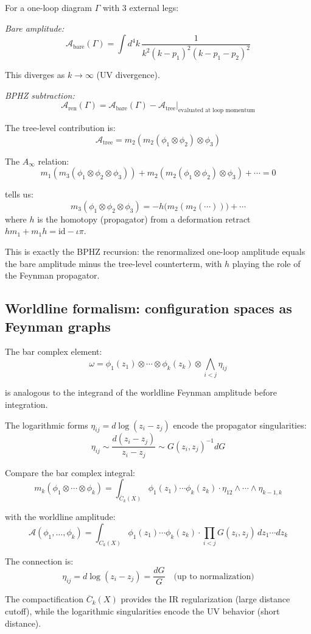 \begin{example}
\label{ex:bphz-one-loop}
For a one-loop diagram $\Gamma$ with 3 external legs:

\emph{Bare amplitude:}
\[\mathcal{A}_{\text{bare}}(\Gamma) = \int d^4k \,
\frac{1}{k^2(k-p_1)^2(k-p_1-p_2)^2}\]

This diverges as $k \to \infty$ (UV divergence).

\emph{BPHZ subtraction:}
\[\mathcal{A}_{\text{ren}}(\Gamma) = \mathcal{A}_{\text{bare}}(\Gamma) - 
\mathcal{A}_{\text{tree}}|_{\text{evaluated at loop momentum}}\]

The tree-level contribution is:
\[\mathcal{A}_{\text{tree}} = m_2(m_2(\phi_1 \otimes \phi_2) \otimes \phi_3)\]

The $A_\infty$ relation:
\[m_1(m_3(\phi_1 \otimes \phi_2 \otimes \phi_3)) + m_2(m_2(\phi_1 \otimes \phi_2) 
\otimes \phi_3) + \cdots = 0\]

tells us:
\[m_3(\phi_1 \otimes \phi_2 \otimes \phi_3) = -h\bigl(m_2(m_2(\cdots))\bigr) + \cdots\]
where $h$ is the homotopy (propagator) from a deformation retract $h m_1 + m_1 h = \mathrm{id} - \iota\pi$.

This is exactly the BPHZ recursion: the renormalized one-loop amplitude equals the
bare amplitude minus the tree-level counterterm, with $h$ playing the role of the Feynman propagator.
\end{example}

\subsection{Worldline formalism: configuration spaces as Feynman graphs}


\begin{conjecture}
\label{conj:bar-worldline}
The bar complex element:
\[\omega = \phi_1(z_1) \otimes \cdots \otimes \phi_k(z_k) \otimes \bigwedge_{i<j}
\eta_{ij}\]

is analogous to the integrand of the worldline Feynman amplitude before integration.

The logarithmic forms $\eta_{ij} = d\log(z_i - z_j)$ encode the propagator 
singularities:
\[\eta_{ij} \sim \frac{d(z_i - z_j)}{z_i - z_j} \sim G(z_i,z_j)^{-1} dG\]
\end{conjecture}

\begin{evidence}
Compare the bar complex integral:
\[m_k(\phi_1 \otimes \cdots \otimes \phi_k) = \int_{\overline{C}_k(X)} 
\phi_1(z_1) \cdots \phi_k(z_k) \cdot \eta_{12} \wedge \cdots \wedge \eta_{k-1,k}\]

with the worldline amplitude:
\[\mathcal{A}(\phi_1,\ldots,\phi_k) = \int_{C_k(X)} \phi_1(z_1) \cdots \phi_k(z_k) 
\cdot \prod_{i<j} G(z_i,z_j) \, dz_1 \cdots dz_k\]

The connection is:
\[\eta_{ij} = d\log(z_i-z_j) = \frac{dG}{G} \quad \text{(up to normalization)}\]

The compactification $\overline{C}_k(X)$ provides the IR regularization (large
distance cutoff), while the logarithmic singularities encode the UV behavior
(short distance).
\end{evidence}



